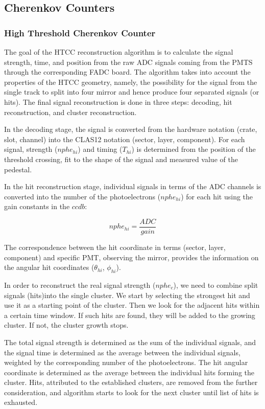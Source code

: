 \documentclass{elsart}
\begin{document}
\subsection{Cherenkov Counters}

\subsubsection{High Threshold Cherenkov Counter}

The goal of the HTCC reconstruction algorithm is to calculate the signal strength, time, and position from the
raw ADC signals coming from the PMTS through the corresponding FADC board. The algorithm takes into account
the properties of the HTCC geometry, namely,  the possibility for the signal from the single track to split into
four mirror and hence produce four separated signals (or hits). The final signal reconstruction is done in three
steps: decoding, hit reconstruction, and cluster reconstruction.

In the decoding stage, the signal is converted from the hardware notation (crate, slot, channel) into the CLAS12
notation (sector, layer, component).  For each signal, strength ($nphe_{hi}$) and timing ($T_{hi}$) is determined
from the position of the threshold crossing, fit to the shape of the signal and measured value of the pedestal. 

In the hit reconstruction stage, individual signals in terms of the ADC channels is converted into the number of
the photoelectrons ($nphe_{hi}$) for each hit using the gain constants in the $ccdb$: 

\begin{equation}
nphe_{hi} = \frac{ADC}{gain}
\end{equation}

The correspondence between the  hit coordinate in terms (sector, layer, component) and specific PMT, observing
the mirror,  provides the information on the angular hit coordinates ($\theta_{hi}$, $\phi_{hi}$).

In order to reconstruct the real signal strength ($nphe_c$), we need to combine split signals (hits)into the single
cluster. We start by selecting the strongest hit and use it as a starting point of the cluster. Then we look for the
adjacent hits within a certain time window.  If such hits are found, they will be added to the growing cluster. If
not, the cluster growth stops.

The total signal strength is determined as the sum of the individual signals, and the signal time is determined as
the average between the individual signals, weighted by the corresponding number of the photoelectrons. The hit
angular coordinate is determined as the average between the individual hits forming the cluster.  Hits, attributed
to the established clusters, are removed from the further consideration, and algorithm starts to look for the next
cluster until list of hits is exhausted.
\end{document}
